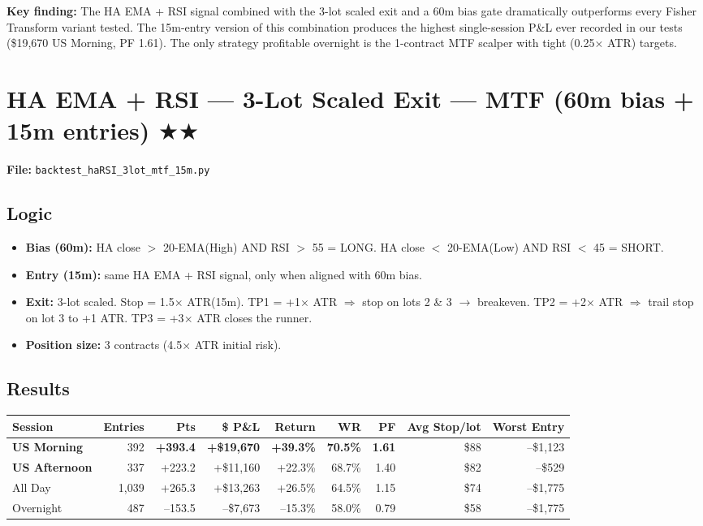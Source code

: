 \documentclass[11pt]{article}
\newcommand{\pos}[1]{\textcolor{posgreen}{\textbf{#1}}}
\newcommand{\neg}[1]{\textcolor{negred}{#1}}
\begin{document}
\textbf{Key finding:} The HA EMA + RSI signal combined with the 3-lot scaled exit and a 60m bias gate dramatically outperforms every Fisher Transform variant tested. The 15m-entry version of this combination produces the highest single-session P\&L ever recorded in our tests (\$19{,}670 US Morning, PF 1.61). The only strategy profitable overnight is the 1-contract MTF scalper with tight (0.25$\times$ ATR) targets.

\newpage
\section{HA EMA + RSI --- 3-Lot Scaled Exit --- MTF (60m bias + 15m entries) \texorpdfstring{$\bigstar\bigstar$}{**}}

\textbf{File:} \texttt{backtest\_haRSI\_3lot\_mtf\_15m.py}

\subsection{Logic}
\begin{itemize}
\item \textbf{Bias (60m):} HA close $>$ 20-EMA(High) AND RSI $>$ 55 = LONG. HA close $<$ 20-EMA(Low) AND RSI $<$ 45 = SHORT.
\item \textbf{Entry (15m):} same HA EMA + RSI signal, only when aligned with 60m bias.
\item \textbf{Exit:} 3-lot scaled. Stop = 1.5$\times$ ATR(15m). TP1 = +1$\times$ ATR $\Rightarrow$ stop on lots 2 \& 3 $\rightarrow$ breakeven. TP2 = +2$\times$ ATR $\Rightarrow$ trail stop on lot 3 to +1 ATR. TP3 = +3$\times$ ATR closes the runner.
\item \textbf{Position size:} 3 contracts (4.5$\times$ ATR initial risk).
\end{itemize}

\subsection{Results}
\begin{table}[h!]
\centering
\small
\begin{tabular}{lrrrrrrrr}
\toprule
Session & Entries & Pts & \$ P\&L & Return & WR & PF & Avg Stop/lot & Worst Entry \\
\midrule
\pos{US Morning}    & 392  & \pos{+393.4} & \pos{+\$19{,}670} & \pos{+39.3\%} & \pos{70.5\%} & \pos{1.61} & \$88  & --\$1{,}123 \\
\pos{US Afternoon}  & 337  & +223.2 & +\$11{,}160 & +22.3\% & 68.7\% & 1.40 & \$82  & --\$529 \\
All Day             & 1{,}039 & +265.3 & +\$13{,}263 & +26.5\% & 64.5\% & 1.15 & \$74  & --\$1{,}775 \\
\neg{Overnight}     & 487  & --153.5 & \neg{--\$7{,}673} & \neg{--15.3\%} & 58.0\% & 0.79 & \$58 & --\$1{,}775 \\
\bottomrule
\end{tabular}
\end{table}
\end{document}
